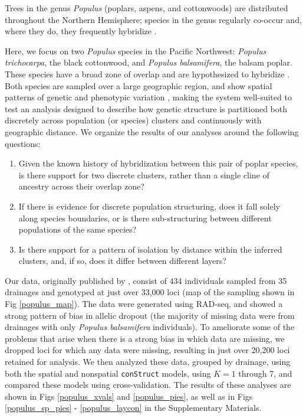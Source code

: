 \documentclass[12pt]{article}
\begin{document}
Trees in the genus \textit{Populus} (poplars, aspens, and cottonwoods) 
are distributed throughout the Northern Hemisphere;
species in the genus regularly co-occur and, 
where they do, they frequently hybridize \citep{eckenwalder1984, Cronk2005}.

Here, we focus on two \textit{Populus} species in the Pacific Northwest: 
\textit{Populus trichocarpa}, the black cottonwood,
and \textit{Populus balsamifera}, the balsam poplar.
These species have a broad zone of overlap and are hypothesized to hybridize \citep{geraldes_etal_2014, suarezgonzalez_etal_2016}.
Both species are sampled over a large geographic region, 
and show spatial patterns of genetic and phenotypic variation \citep{slavov_etal_2012, mckown_etal_2013},
making the system well-suited to test an analysis designed to describe
how genetic structure is partitioned both discretely across population (or species) clusters
and continuously with geographic distance.
We organize the results of our analyses around the following questions: 
\begin{enumerate}
\item Given the known history of hybridization between this pair of poplar species, 
is there support for two discrete clusters, 
rather than a single cline of ancestry across their overlap zone?
\item If there is evidence for discrete population structuring, 
does it fall solely along species boundaries, 
or is there sub-structuring between different populations of the same species?
\item Is there support for a pattern of isolation by distance within
the inferred clusters, and, if so, 
does it differ between different layers?
\end{enumerate}

Our data, originally published by \cite{geraldes_etal_2014}, 
consist of 434 individuals sampled from 35 drainages 
and genotyped at just over 33,000 loci (map of the sampling shown in Fig \ref{populus_map}).
The data were generated using RAD-seq, 
and showed a strong pattern of bias in allelic dropout 
(the majority of missing data were from drainages with only \textit{Populus balsamifera} individuals).
To ameliorate some of the problems that arise when there is a strong bias in which data are missing, 
we dropped loci for which any data were missing, 
resulting in just over 20,200 loci retained for analysis.  
We then analyzed these data, grouped by drainage, using both the spatial and nonspatial \texttt{conStruct} models, 
using $K = 1$ through 7,
and compared these models using cross-validation.
The results of these analyses are shown in 
Figs \ref{populus_xvals} and \ref{populus_pies}, 
as well as in Figs \ref{populus_sp_pies} - \ref{populus_laycon} in the Supplementary Materials.
\end{document}
